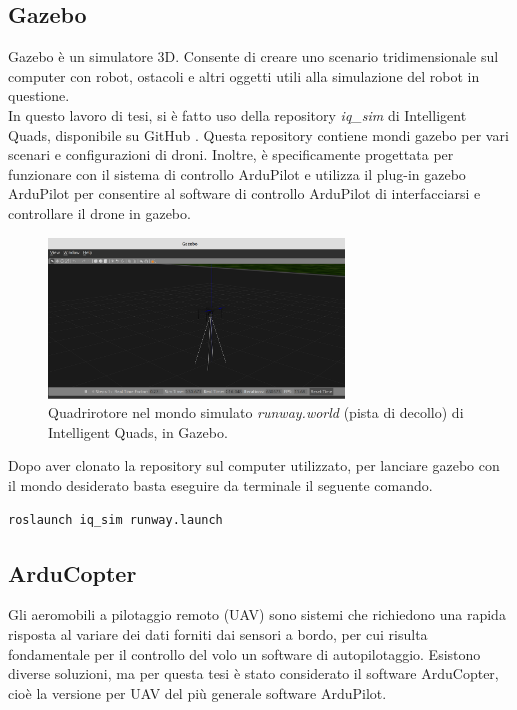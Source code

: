 \subsection{Gazebo}
Gazebo è un simulatore 3D. Consente di creare uno scenario tridimensionale sul computer con robot, ostacoli e altri oggetti utili alla simulazione del robot in questione.\\

In questo lavoro di tesi, si è fatto uso della repository \emph{iq\_sim} di Intelligent Quads, disponibile su GitHub \cite{iqSIM}. Questa repository contiene mondi gazebo per vari scenari e configurazioni di droni. Inoltre, è specificamente progettata per funzionare con il sistema di controllo ArduPilot e utilizza il plug-in gazebo ArduPilot per consentire al software di controllo ArduPilot di interfacciarsi e controllare il drone in gazebo.

\begin{figure}[H]
	\centering
	\includegraphics[width=0.7\textwidth]{gfx/ROS/gazebo_new}
	\caption[Quadrirotore nel mondo simulato.]{Quadrirotore nel mondo simulato \emph{runway.world} (pista di decollo) di Intelligent Quads, in Gazebo.}
	\label{fig:gazebo}
\end{figure}

Dopo aver clonato la repository sul computer utilizzato, per lanciare gazebo con il mondo desiderato basta eseguire da terminale il seguente comando.\\

\begin{lstlisting}[language=bash, numbers=none]
  roslaunch iq_sim runway.launch
\end{lstlisting}

\subsection{ArduCopter}
Gli aeromobili a pilotaggio remoto (\acs{UAV}) sono sistemi che richiedono una rapida risposta al variare dei dati forniti dai sensori a bordo, per cui risulta fondamentale per il controllo del volo un software di autopilotaggio. Esistono diverse soluzioni, ma per questa tesi è stato considerato il software ArduCopter, cioè la versione per \acs{UAV} del più generale software ArduPilot.\\


